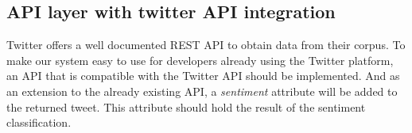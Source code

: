 	\subsection{API layer with twitter API integration}
	Twitter offers a well documented REST API to obtain data from their corpus. To make our system easy to use for developers already using the Twitter platform, an API that is compatible with the Twitter API should be implemented. And as an extension to the already existing API, a \emph{sentiment} attribute will be added to the returned tweet. This attribute should hold the result of the sentiment classification.
	
	